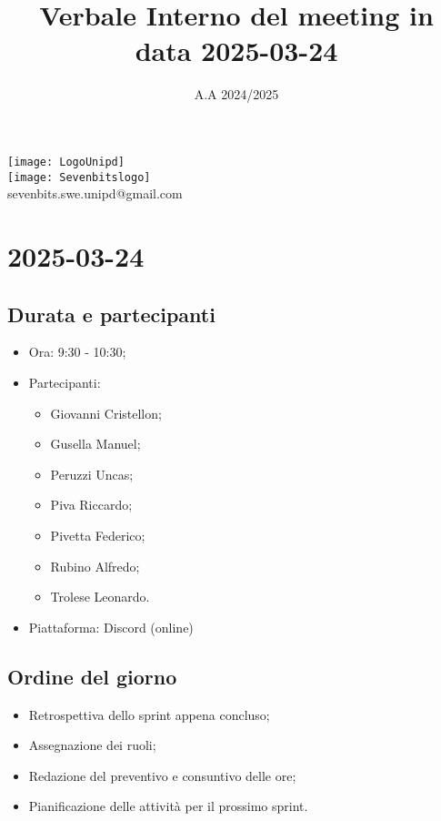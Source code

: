 \documentclass[10pt]{article}
\title{Verbale Interno del meeting in data 2025-03-24}
\date{A.A 2024/2025}
\begin{document}
\maketitle
\begin{center}
\texttt{[image: LogoUnipd]}\\
\texttt{[image: Sevenbitslogo]}\\
sevenbits.swe.unipd@gmail.com\\
\vspace{2mm}
\end{center}
\newpage
\tableofcontents
\newpage
\section{2025-03-24}
\subsection{Durata e partecipanti}
\begin{itemize}
\item Ora: 9:30 - 10:30;
\item Partecipanti:
	\begin{itemize}
            \item Giovanni Cristellon;
		\item Gusella Manuel;
		\item Peruzzi Uncas;
		\item Piva Riccardo;
		\item Pivetta Federico;
		\item Rubino Alfredo;
		\item Trolese Leonardo.
	\end{itemize}
\item Piattaforma: Discord (online)
\end{itemize}

\subsection{Ordine del giorno}
\begin{itemize}
    \item Retrospettiva dello sprint appena concluso;
    \item Assegnazione dei ruoli;
    \item Redazione del preventivo e consuntivo delle ore;
    \item Pianificazione delle attività per il prossimo sprint.
\end{itemize}
\end{document}
